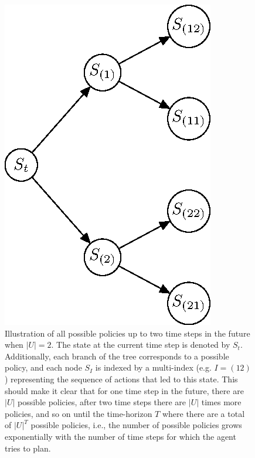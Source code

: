 \documentclass[twoside,11pt]{article}
\begin{document}
\begin{figure}[H]
	\begin{center}
	\includegraphics[scale=0.8]{BTAI-figure3}
	\end{center}
    \caption{Illustration of all possible policies up to two time steps in the future when $|U| = 2$. The state at the current time step is denoted by $S_t$. Additionally, each branch of the tree corresponds to a possible policy, and each node $S_I$ is indexed by a multi-index (e.g. $I=(12)$) representing the sequence of actions that led to this state. This should make it clear that for one time step in the future, there are $|U|$ possible policies, after two time steps there are $|U|$ times more policies, and so on until the time-horizon $T$ where there are a total of $|U|^T$ possible policies, i.e., the number of possible policies grows exponentially with the number of time steps for which the agent tries to plan.}
    \label{fig:exp_class}
\end{figure}
\end{document}
